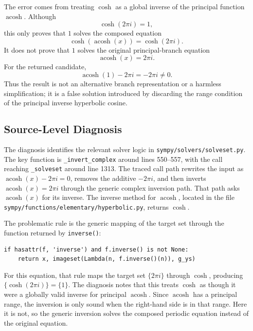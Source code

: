 \documentclass[11pt]{article}
\begin{document}
The error comes from treating \(\cosh\) as a global inverse of the principal
function \(\operatorname{acosh}\).  Although
\[
  \cosh(2\pi i)=1,
\]
this only proves that \(1\) solves the composed equation
\[
  \cosh(\operatorname{acosh}(x)) = \cosh(2\pi i).
\]
It does not prove that \(1\) solves the original principal-branch equation
\[
  \operatorname{acosh}(x)=2\pi i.
\]
For the returned candidate,
\[
  \operatorname{acosh}(1)-2\pi i = -2\pi i \ne 0.
\]
Thus the result is not an alternative branch representation or a harmless
simplification; it is a false solution introduced by discarding the range
condition of the principal inverse hyperbolic cosine.

\subsection{Source-Level Diagnosis}

The diagnosis identifies the relevant solver logic in
{\footnotesize\nolinkurl{sympy/solvers/solveset.py}}.  The key function is
\texttt{\_invert\_complex} around lines 550--557, with the call reaching
\texttt{\_solveset} around line 1313.  The traced call path rewrites the input
as \(\operatorname{acosh}(x)-2\pi i=0\), removes the additive
\(-2\pi i\), and then inverts
\(\operatorname{acosh}(x)=2\pi i\) through the generic complex inversion path.
That path asks \(\operatorname{acosh}(x)\) for its inverse.  The inverse
method for \(\operatorname{acosh}\), located in the file
{\footnotesize\nolinkurl{sympy/functions/elementary/hyperbolic.py}}, returns
\(\cosh\).

The problematic rule is the generic mapping of the target set through the
function returned by \texttt{inverse()}:

\begin{lstlisting}[style=bugpython]
if hasattr(f, 'inverse') and f.inverse() is not None:
    return x, imageset(Lambda(n, f.inverse()(n)), g_ys)
\end{lstlisting}

For this equation, that rule maps the target set \(\{2\pi i\}\) through
\(\cosh\), producing \(\{\cosh(2\pi i)\}=\{1\}\).  The diagnosis notes that
this treats \(\cosh\) as though it were a globally valid inverse for
principal \(\operatorname{acosh}\).  Since \(\operatorname{acosh}\) has a
principal range, the inversion is only sound when the right-hand side is in
that range.  Here it is not, so the generic inversion solves the composed
periodic equation instead of the original equation.
\end{document}
